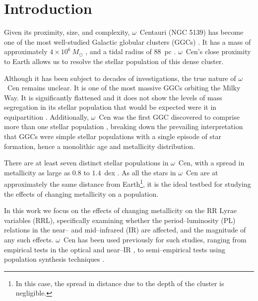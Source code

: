 \documentclass[a4paper,fleqn,usenatbib]{mnras}
\newcommand{\ocen}{$\omega$~Cen\xspace}
\begin{document}
\section{Introduction}
\label{sec:intro}

Given its proximity, size, and complexity, $\omega$~Centauri (NGC 5139) has become one of the most well-studied Galactic globular clusters (GGCs) \citep{2002ASPC..265.....V}. It has a mass of approximately $4 \times 10^6~M_{\odot}$ \citep{2013MNRAS.429.1887D}, and a tidal radius of 88~pc \citep{2005MNRAS.360..631M}. \ocen's close proximity to Earth \citep[$d \sim 5.5$~kpc, e.g.][]{2006ApJ...652..362D, 2001AJ....121.3089T} allows us to resolve the stellar population of this dense cluster. 

Although it has been subject to decades of investigations, the true nature of \ocen remains unclear. It is one of the most massive GGCs orbiting the Milky Way. It is significantly flattened \citep[$\epsilon = 1 - b/a = 0.17$][]{2005MNRAS.360..631M} and it does not show the levels of mass segregation in its stellar population that would be expected were it in equipartition \citep{2002ASPC..265...87A}. Additionally, \ocen was the first GGC discovered to comprise more than one stellar population \citep{1999Natur.402...55L}, breaking down the prevailing interpretation that GGCs were simple stellar populations with a single episode of star formation, hence a monolithic age and metallicity distribution.

There are at least seven distinct stellar populations in \ocen \citep{2016MNRAS.457.4525T}, with a spread in metallicity as large as $0.8$ to $1.4$~dex \citep{2014ApJ...791..107V, 2012ApJ...746...14M, 2010ApJ...722.1373J}. As all the stars in \ocen are at approximately the same distance from Earth\footnote{In this case, the spread in distance due to the depth of the cluster is negligible.}, it is the ideal testbed for studying the effects of changing metallicity on a population.

In this work we focus on the effects of changing metallicity on the RR Lyrae variables (RRL), specifically examining whether the period--luminosity (PL) relations in the near-- and mid--infrared (IR) are affected, and the magnitude of any such effects. \ocen has been used previously for such studies, ranging from empirical tests in the optical \citep[e.g.][]{2003MNRAS.345...86O, 1991ApJ...373L..43L} and near--IR \citep[e.g.][]{2006MmSAI..77..245C, 2006ApJ...652..362D}, to semi--empirical tests using population synthesis techniques \citep{2016MNRAS.457.4525T}. 
\end{document}
